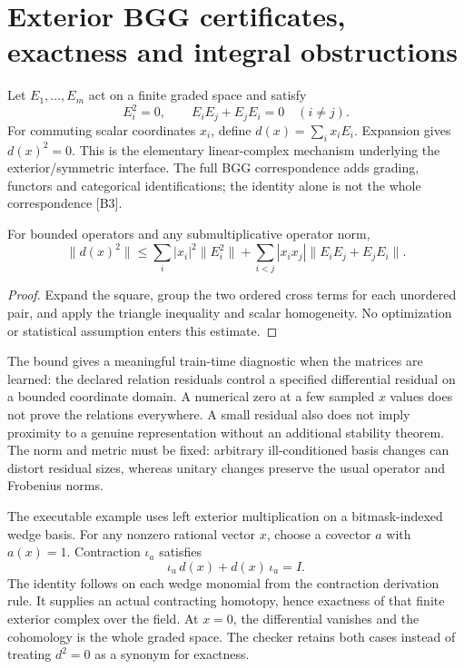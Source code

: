 \section{Exterior BGG certificates, exactness and integral obstructions}
\label{sec:wb-exterior-bgg}

Let $E_1,\ldots,E_m$ act on a finite graded space and satisfy
\[
 E_i^2=0,\qquad E_iE_j+E_jE_i=0\quad(i\ne j).
\]
For commuting scalar coordinates $x_i$, define $d(x)=\sum_i x_iE_i$. Expansion gives $d(x)^2=0$. This is the elementary linear-complex mechanism underlying the exterior/symmetric interface. The full BGG correspondence adds grading, functors and categorical identifications; the identity alone is not the whole correspondence [B3].

\begin{proposition}
For bounded operators and any submultiplicative operator norm,
\[
 \|d(x)^2\|\le
 \sum_i |x_i|^2\|E_i^2\|+
 \sum_{i<j}|x_ix_j|\|E_iE_j+E_jE_i\|.
\]
\end{proposition}
\begin{proof}
Expand the square, group the two ordered cross terms for each unordered pair, and apply the triangle inequality and scalar homogeneity. No optimization or statistical assumption enters this estimate.
\end{proof}

The bound gives a meaningful train-time diagnostic when the matrices are learned: the declared relation residuals control a specified differential residual on a bounded coordinate domain. A numerical zero at a few sampled $x$ values does not prove the relations everywhere. A small residual also does not imply proximity to a genuine representation without an additional stability theorem. The norm and metric must be fixed: arbitrary ill-conditioned basis changes can distort residual sizes, whereas unitary changes preserve the usual operator and Frobenius norms.

The executable example uses left exterior multiplication on a bitmask-indexed wedge basis. For any nonzero rational vector $x$, choose a covector $a$ with $a(x)=1$. Contraction $\iota_a$ satisfies
\[
 \iota_a\,d(x)+d(x)\,\iota_a=I.
\]
The identity follows on each wedge monomial from the contraction derivation rule. It supplies an actual contracting homotopy, hence exactness of that finite exterior complex over the field. At $x=0$, the differential vanishes and the cohomology is the whole graded space. The checker retains both cases instead of treating $d^2=0$ as a synonym for exactness.

